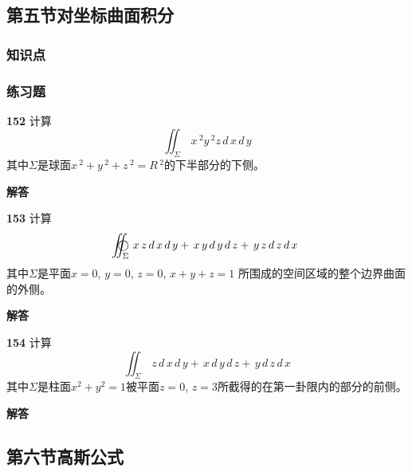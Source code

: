 \documentclass[a4paper,10pt]{article} %
\newcommand{\oiint}{\,\bigcirc\kern -17.3pt\int\kern -7.5pt\int}
\begin{document}

\textheight

\newpage
\subsection{第五节\quad 对坐标曲面积分}
\subsubsection{知识点}
\subsubsection{练习题}
\par\noindent \textbf{152} \quad 计算
$$ \iint_{\Sigma} \,x\,^2y\,^2z\,d\,x\,d\,y$$
其中$\Sigma$是球面$x\,^2+y\,^2+z\,^2=R\,^2$的下半部分的下侧。
\par\noindent \textbf{ 解答}




\textheight


\par\noindent \textbf{153} \quad 计算
$$\oiint_{\Sigma} \,x\,z\,d\,x\,d\,y+\,x\,y\,d\,y\,d\,z+\,y\,z\,d\,z\,d\,x$$
其中$\Sigma$是平面$x=0$, $y=0$, $z=0$, $x+y+z=1$ 所围成的空间区域的整个边界曲面的外侧。
\par\noindent \textbf{ 解答}




\textheight


\par\noindent \textbf{154} \quad 计算
$$\iint_{\Sigma} \,z\,d\,x\,d\,y+\,x\,d\,y\,d\,z+\,y\,d\,z\,d\,x$$
其中$\Sigma$是柱面$x^2+y^2=1$被平面$z=0$, $z=3$所截得的在第一卦限内的部分的前侧。
\par\noindent \textbf{ 解答}




\textheight

\newpage
\subsection{第六节\quad 高斯公式}
\end{document}
